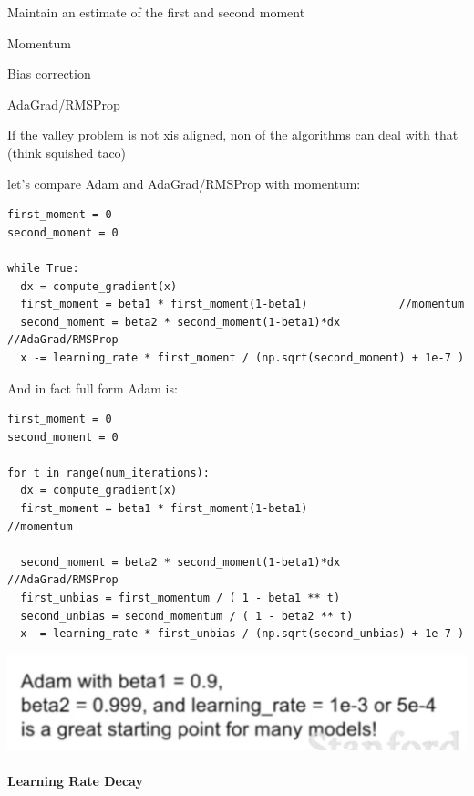 Maintain an estimate of the first and second moment

Momentum

Bias correction

AdaGrad/RMSProp

If the valley problem is not xis aligned, non of the algorithms can deal with that (think squished taco)



let's compare Adam and AdaGrad/RMSProp with momentum:

\begin{verbatim}
first_moment = 0
second_moment = 0

while True:
  dx = compute_gradient(x)
  first_moment = beta1 * first_moment(1-beta1)              //momentum
  second_moment = beta2 * second_moment(1-beta1)*dx         //AdaGrad/RMSProp
  x -= learning_rate * first_moment / (np.sqrt(second_moment) + 1e-7 )  
\end{verbatim}



And in fact full form Adam is: 

\begin{verbatim}
first_moment = 0 
second_moment = 0

for t in range(num_iterations):
  dx = compute_gradient(x)
  first_moment = beta1 * first_moment(1-beta1)   						//momentum

  second_moment = beta2 * second_moment(1-beta1)*dx					//AdaGrad/RMSProp
  first_unbias = first_momentum / ( 1 - beta1 ** t)
  second_unbias = second_momentum / ( 1 - beta2 ** t)
  x -= learning_rate * first_unbias / (np.sqrt(second_unbias) + 1e-7 )
\end{verbatim}


\includegraphics[width=0.5\columnwidth]{fei_fei_li/lecture_07/adam_params.png}

\paragraph{Learning Rate Decay}


